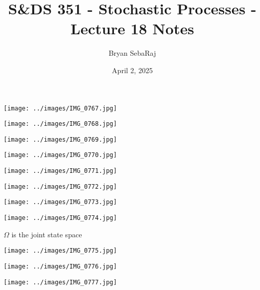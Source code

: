\documentclass{article}
\title{S\&DS 351 - Stochastic Processes - Lecture 18 Notes}
\author{Bryan SebaRaj}
\date{April 2, 2025}
\begin{document}
\maketitle


\texttt{[image: ../images/IMG\_0767.jpg]}

\texttt{[image: ../images/IMG\_0768.jpg]}

\texttt{[image: ../images/IMG\_0769.jpg]}

\texttt{[image: ../images/IMG\_0770.jpg]}

\texttt{[image: ../images/IMG\_0771.jpg]}

\texttt{[image: ../images/IMG\_0772.jpg]}

\texttt{[image: ../images/IMG\_0773.jpg]}

\texttt{[image: ../images/IMG\_0774.jpg]}

$\Omega$ is the joint state space

\texttt{[image: ../images/IMG\_0775.jpg]}

\texttt{[image: ../images/IMG\_0776.jpg]}

\texttt{[image: ../images/IMG\_0777.jpg]}



\end{document}
